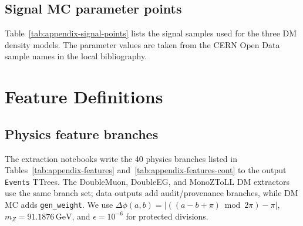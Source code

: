 \documentclass[11pt,a4paper,twocolumn]{article}
\newcommand{\GeV}{\text{GeV}}
\begin{document}
\subsection{Signal MC parameter points}
\label{app:signal-points}

Table~\ref{tab:appendix-signal-points} lists the signal samples used for the three DM
density models. The parameter values are taken from the CERN Open Data sample names in
the local bibliography.

\begin{table}[h]
\centering
\caption{MonoZToLL signal MC parameter points and extracted event counts.}
\label{tab:appendix-signal-points}
\end{table}
\clearpage 
\section{Feature Definitions}
\label{app:feature-definitions}

\subsection{Physics feature branches}
\label{app:features}

The extraction notebooks write the 40 physics branches listed in
Tables~\ref{tab:appendix-features} and~\ref{tab:appendix-features-cont} to the output \texttt{Events} TTrees. The DoubleMuon,
DoubleEG, and MonoZToLL DM extractors use the same branch set; data outputs add
audit/provenance branches, while DM MC adds \texttt{gen\_weight}. We use
\(\Delta\phi(a,b)=|((a-b+\pi)\bmod 2\pi)-\pi|\), \(m_Z=91.1876\,\GeV\), and
\(\epsilon=10^{-6}\) for protected divisions.
\end{document}
